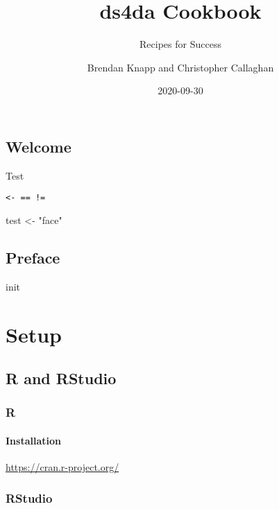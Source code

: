 \documentclass[
]{book}
\title{ds4da Cookbook}
\subtitle{Recipes for Success}
\author{Brendan Knapp and Christopher Callaghan}
\date{2020-09-30}
\newenvironment{Shaded}{\begin{snugshade}}{\end{snugshade}}
\newcommand{\NormalTok}[1]{#1}
\newcommand{\StringTok}[1]{\textcolor[rgb]{0.31,0.60,0.02}{#1}}
\begin{document}
\maketitle

{
\setcounter{tocdepth}{1}
\tableofcontents
}
\hypertarget{welcome}{%
\chapter*{Welcome}\label{welcome}}

Test

\texttt{\textless{}-\ ==\ !=}

\begin{Shaded}
\begin{Highlighting}[]
\NormalTok{test <-}\StringTok{ "face"}
\end{Highlighting}
\end{Shaded}

\hypertarget{preface}{%
\chapter*{Preface}\label{preface}}

init

\cleardoublepage

\hypertarget{part-setup}{%
\part{Setup}\label{part-setup}}

\hypertarget{setup-r-and-rstudio}{%
\chapter{R and RStudio}\label{setup-r-and-rstudio}}

\hypertarget{r}{%
\section{R}\label{r}}

\hypertarget{installation}{%
\subsection{Installation}\label{installation}}

\url{https://cran.r-project.org/}

\hypertarget{rstudio}{%
\section{RStudio}\label{rstudio}}
\end{document}
